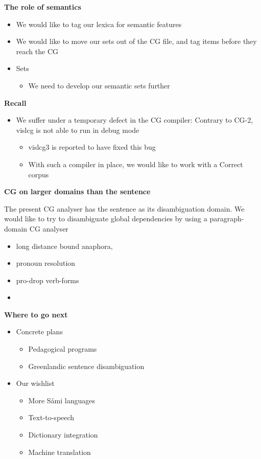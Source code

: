 \documentclass[landscape,english,11pt]{seminar}
\begin{document}
\begin{slide}
\newslide
\textbf{The role of semantics}
\begin{itemize}
 \item We would like to tag our lexica for semantic features
 \item We would like to move our sets out of the CG file, and tag items before they reach the CG
 \item Sets
  \begin{itemize}
  \item We need to develop our semantic sets further
  \end{itemize}
\end{itemize}
 
\newslide
\textbf{Recall}

\begin{itemize}
  \item We suffer under a temporary defect in the CG compiler: Contrary to CG-2, vislcg is not able to run in debug mode
 \begin{itemize}
  \item vislcg3 is reported to have fixed this bug
  \item With such a compiler in place, we would like to work with a Correct corpus
  \end{itemize}
\end{itemize}


\newslide
\textbf{CG on larger domains than the sentence}

The present CG analyser has the sentence as its disambiguation domain. We would like to try to disambiguate global dependencies by using a paragraph-domain CG analyser

\begin{itemize}
\item long distance bound anaphora, 
\item pronoun resolution 
\item pro-drop verb-forms
\end{itemize}

\newslide
\textbf{}
\begin{itemize}
\item
\end{itemize}


\newslide
\textbf{Where to go next}
\begin{itemize}
\item Concrete plans
\begin{itemize}
\item Pedagogical programs
\item Greenlandic sentence disambiguation
\end{itemize}
\item Our wishlist
\begin{itemize}
\item More Sámi languages
\item Text-to-speech
\item Dictionary integration
\item Machine translation
\end{itemize}
\end{itemize}



\end{slide}
\end{document}
